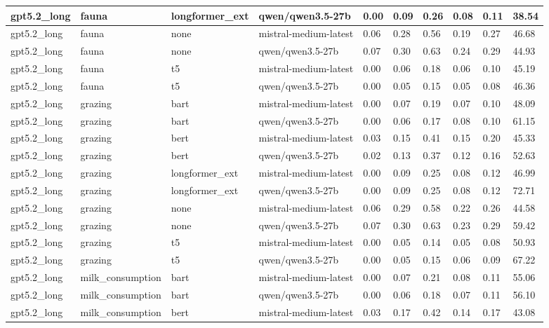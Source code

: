 \begin{tabular}{|l|l|l|l|l|l|l|l|l|l|}
 \hline
 gpt5.2\_long & fauna & longformer\_ext & qwen/qwen3.5-27b & 0.00 & 0.09 & 0.26 & 0.08 & 0.11 & 38.54 \\
 \hline
 gpt5.2\_long & fauna & none & mistral-medium-latest & 0.06 & 0.28 & 0.56 & 0.19 & 0.27 & 46.68 \\
 \hline
 gpt5.2\_long & fauna & none & qwen/qwen3.5-27b & 0.07 & 0.30 & 0.63 & 0.24 & 0.29 & 44.93 \\
 \hline
 gpt5.2\_long & fauna & t5 & mistral-medium-latest & 0.00 & 0.06 & 0.18 & 0.06 & 0.10 & 45.19 \\
 \hline
 gpt5.2\_long & fauna & t5 & qwen/qwen3.5-27b & 0.00 & 0.05 & 0.15 & 0.05 & 0.08 & 46.36 \\
 \hline
 gpt5.2\_long & grazing & bart & mistral-medium-latest & 0.00 & 0.07 & 0.19 & 0.07 & 0.10 & 48.09 \\
 \hline
 gpt5.2\_long & grazing & bart & qwen/qwen3.5-27b & 0.00 & 0.06 & 0.17 & 0.08 & 0.10 & 61.15 \\
 \hline
 gpt5.2\_long & grazing & bert & mistral-medium-latest & 0.03 & 0.15 & 0.41 & 0.15 & 0.20 & 45.33 \\
 \hline
 gpt5.2\_long & grazing & bert & qwen/qwen3.5-27b & 0.02 & 0.13 & 0.37 & 0.12 & 0.16 & 52.63 \\
 \hline
 gpt5.2\_long & grazing & longformer\_ext & mistral-medium-latest & 0.00 & 0.09 & 0.25 & 0.08 & 0.12 & 46.99 \\
 \hline
 gpt5.2\_long & grazing & longformer\_ext & qwen/qwen3.5-27b & 0.00 & 0.09 & 0.25 & 0.08 & 0.12 & 72.71 \\
 \hline
 gpt5.2\_long & grazing & none & mistral-medium-latest & 0.06 & 0.29 & 0.58 & 0.22 & 0.26 & 44.58 \\
 \hline
 gpt5.2\_long & grazing & none & qwen/qwen3.5-27b & 0.07 & 0.30 & 0.63 & 0.23 & 0.29 & 59.42 \\
 \hline
 gpt5.2\_long & grazing & t5 & mistral-medium-latest & 0.00 & 0.05 & 0.14 & 0.05 & 0.08 & 50.93 \\
 \hline
 gpt5.2\_long & grazing & t5 & qwen/qwen3.5-27b & 0.00 & 0.05 & 0.15 & 0.06 & 0.09 & 67.22 \\
 \hline
 gpt5.2\_long & milk\_consumption & bart & mistral-medium-latest & 0.00 & 0.07 & 0.21 & 0.08 & 0.11 & 55.06 \\
 \hline
 gpt5.2\_long & milk\_consumption & bart & qwen/qwen3.5-27b & 0.00 & 0.06 & 0.18 & 0.07 & 0.11 & 56.10 \\
 \hline
 gpt5.2\_long & milk\_consumption & bert & mistral-medium-latest & 0.03 & 0.17 & 0.42 & 0.14 & 0.17 & 43.08 \\

\end{tabular}
